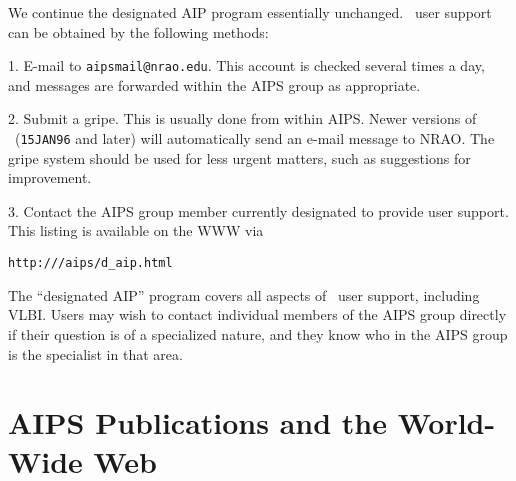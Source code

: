 We continue the designated AIP program essentially unchanged. \AIPS\
user support can be obtained by the following methods:
\begin{description}
\vspace{-10pt}

\item{ 1.} {E-mail to {\tt aipsmail@nrao.edu}. This account is checked
several times a day, and messages are forwarded within the AIPS group
as appropriate.}

\item{ 2.} {Submit a gripe. This is usually done from within
AIPS. Newer versions of \AIPS\ ({\tt 15JAN96} and later) will
automatically send an e-mail message to NRAO. The gripe system should
be used for less urgent matters, such as suggestions for improvement.}

\item{ 3.} {Contact the AIPS group member currently designated to
provide user support. This listing is available on the WWW via}

\end{description}
\begin{center}
\vskip -10pt
{\tt http://\cww/aips/d\_aip.html}
\vskip -10pt
\end{center}

The ``designated AIP'' program covers all aspects of \AIPS\ user
support, including VLBI. Users may wish to contact individual members
of the AIPS group directly if their question is of a specialized
nature, and they know who in the AIPS group is the specialist in that
area.



\section{AIPS Publications and the World-Wide Web}

